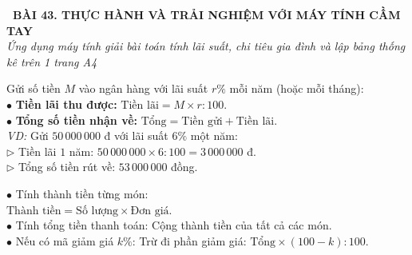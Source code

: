 \documentclass[14pt,a4paper,oneside]{extbook}
\begin{document}
\noindent
\begin{tcolorbox}[
  enhanced,
  colback=teal!8!white,
  colframe=teal!80!black,
  arc=3mm,
  boxrule=1.1pt,
  width=\linewidth,
  halign=center,
  top=2.2mm, bottom=2.2mm,
  left=3mm, right=3mm,
  drop fuzzy shadow
]
  {\large\bfseries\color{teal!95!black}\faBookmark\ BÀI 43. THỰC HÀNH VÀ TRẢI NGHIỆM VỚI MÁY TÍNH CẦM TAY}\\[2pt]
  {\scriptsize\color{black!75}\itshape Ứng dụng máy tính giải bài toán tính lãi suất, chi tiêu gia đình và lập bảng thống kê trên 1 trang A4}
\end{tcolorbox}

\vspace{3.2mm}
\noindent
\begin{minipage}[t]{0.54\textwidth}
  \begin{tcolorbox}[
    enhanced,
    title={\footnotesize\bfseries\color{white}\faBank\ 1. Bài toán gửi tiền tiết kiệm ngân hàng},
    colback=blue!2!white,
    colframe=blue!75!black,
    arc=2.5mm, boxrule=0.8pt, top=1.8mm, bottom=1.8mm, left=2.2mm, right=2.2mm
  ]
    \footnotesize
    Gửi số tiền $M$ vào ngân hàng với lãi suất $r\%$ mỗi năm (hoặc mỗi tháng):\\
    $\bullet$ \textbf{Tiền lãi thu được:} $\text{Tiền lãi} = M \times r : 100$.\\
    $\bullet$ \textbf{Tổng số tiền nhận về:} $\text{Tổng} = \text{Tiền gửi} + \text{Tiền lãi}$.\\
    \textit{VD:} Gửi $50\,000\,000$ đ với lãi suất $6\%$ một năm:\\
    $\triangleright$ Tiền lãi $1$ năm: $50\,000\,000 \times 6 : 100 = 3\,000\,000$ đ.\\
    $\triangleright$ Tổng số tiền rút về: $53\,000\,000$ đồng.
  \end{tcolorbox}
\end{minipage}%
\hfill
\begin{minipage}[t]{0.44\textwidth}
  \begin{tcolorbox}[
    enhanced,
    title={\footnotesize\bfseries\color{white}\faShoppingCart\ 2. Bài toán hóa đơn mua sắm},
    colback=teal!2!white,
    colframe=teal!75!black,
    arc=2.5mm, boxrule=0.8pt, top=1.8mm, bottom=1.8mm, left=2mm, right=2mm
  ]
    \footnotesize
    $\bullet$ Tính thành tiền từng món:\\
    $\text{Thành tiền} = \text{Số lượng} \times \text{Đơn giá}$.\\
    $\bullet$ Tính tổng tiền thanh toán: Cộng thành tiền của tất cả các món.\\
    $\bullet$ Nếu có mã giảm giá $k\%$: Trừ đi phần giảm giá: $\text{Tổng} \times (100 - k) : 100$.
  \end{tcolorbox}
\end{minipage}
\end{document}
